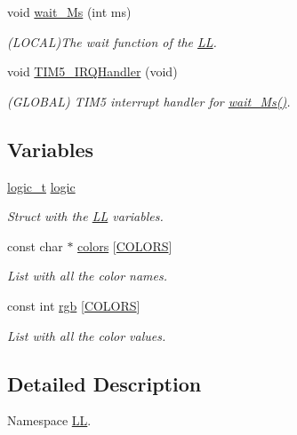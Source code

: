 \begin{DoxyCompactItemize}
void \mbox{\hyperlink{namespace_l_l_ab30bdedb41438098df71bea7d5eb624d}{wait\+\_\+\+Ms}} (int ms)
\begin{DoxyCompactList}\small\item\em (L\+O\+C\+AL)The wait function of the \mbox{\hyperlink{namespace_l_l}{LL}}. \end{DoxyCompactList}\item 
void \mbox{\hyperlink{namespace_l_l_a5e66446caf21dd90191dc07a13ce2378}{T\+I\+M5\+\_\+\+I\+R\+Q\+Handler}} (void)
\begin{DoxyCompactList}\small\item\em (G\+L\+O\+B\+AL) T\+I\+M5 interrupt handler for \mbox{\hyperlink{namespace_l_l_ab30bdedb41438098df71bea7d5eb624d}{wait\+\_\+\+Ms()}}. \end{DoxyCompactList}\end{DoxyCompactItemize}
\subsection*{Variables}
\begin{DoxyCompactItemize}
\item 
\mbox{\hyperlink{struct_l_l_1_1logic__t}{logic\+\_\+t}} \mbox{\hyperlink{namespace_l_l_ac675f1a7fd8efbaf36d511424a5f24ce}{logic}}
\begin{DoxyCompactList}\small\item\em Struct with the \mbox{\hyperlink{namespace_l_l}{LL}} variables. \end{DoxyCompactList}\item 
const char $\ast$ \mbox{\hyperlink{namespace_l_l_a4a2f81c33b1d2c746488022b4ebf7a3a}{colors}} \mbox{[}\mbox{\hyperlink{group___global_ga883046b8f0d1f6368a9b9eaf5ca36af3}{C\+O\+L\+O\+RS}}\mbox{]}
\begin{DoxyCompactList}\small\item\em List with all the color names. \end{DoxyCompactList}\item 
const int \mbox{\hyperlink{namespace_l_l_a49c70cdbac1a1c4df4224875018c75b4}{rgb}} \mbox{[}\mbox{\hyperlink{group___global_ga883046b8f0d1f6368a9b9eaf5ca36af3}{C\+O\+L\+O\+RS}}\mbox{]}
\begin{DoxyCompactList}\small\item\em List with all the color values. \end{DoxyCompactList}\end{DoxyCompactItemize}


\subsection{Detailed Description}
Namespace \mbox{\hyperlink{namespace_l_l}{LL}}. 

